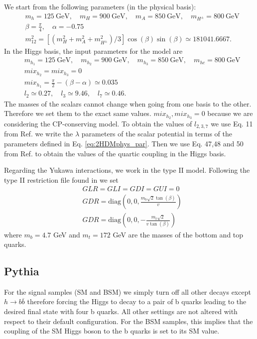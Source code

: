 We start from the following parameters (in the physical basis):
\begin{align}
	&m_h=125 ~\text{GeV}, \quad m_H=900 ~\text{GeV},\quad m_A=850 ~\text{GeV}, \quad m_{H^{\pm}}=800 ~\text{GeV} \nonumber \\
	&\beta=\frac{\pi}{4}, \quad \alpha = -0.75\nonumber \\	 
	&m_{12}^2=[(m_H^2+m_A^2+m_{H^{\pm}}^2)/3] \cos(\beta)\sin(\beta)\simeq181041.6667.
	\label{eq:2HDMphys_par}
\end{align}
In the Higgs basis, the input parameters for the model are
\begin{align}
&m_{h_1}=125 ~\text{GeV}, \quad m_{h_2}=900 ~\text{GeV},\quad m_{h_3}=850 ~\text{GeV}, \quad m_{hc}=800 ~\text{GeV} \nonumber \\
&mix_{h_2}=mix_{h_3} =0 \nonumber \\
&mix_{h_1}=\frac{\pi}{2}-(\beta-\alpha)\simeq 0.035 \nonumber \\
&l_2\simeq 0.27, \quad l_3\simeq 9.46, \quad l_7\simeq 0.46.
\label{eq:2HDMhiggs_par}
\end{align}
The masses of the scalars cannot change when going from one basis to the other. Therefore we set them to the exact same values. $mix_{h_2},mix_{h_3}=0$ because we are considering the CP-conserving model.
To obtain the values of $l_{2,3,7}$ we use Eq. 11 from Ref. \cite{2HDMpedro} we write the $\lambda$ parameters of the scalar potential in terms of the parameters defined in Eq. \ref{eq:2HDMphys_par}. Then we use Eq. 47,48 and 50 from Ref. \cite{2HDMhaber} to obtain the values of the quartic coupling in the Higgs basis.

Regarding the Yukawa interactions, we work in the type II model. Following the type II restriction file found in \cite{2HDM} we set
\begin{align}
	&GLR=GLI=GDI=GUI=0 \nonumber \\
	&GDR=\text{diag}\left(0,0,\frac{m_b\sqrt{2}\tan(\beta)}{v}\right) \nonumber \\
	&GDR=\text{diag}\left(0,0,-\frac{m_t\sqrt{2}}{v\tan(\beta)}\right)
\end{align}	
where $m_b=4.7$ GeV and $m_t=172$ GeV are the masses of the bottom and top quarks.

\subsection{Pythia}
\label{sec:Pythia_samples}

For the signal samples (SM and BSM) we simply turn off all other decays except $h\rightarrow b\overline{b}$ therefore forcing the Higgs to decay to a pair of b quarks leading to the desired final state with four b quarks. All other settings are not altered with respect to their default configuration. For the BSM samples, this implies that the coupling of the SM Higgs boson to the b quarks is set to its SM value.

